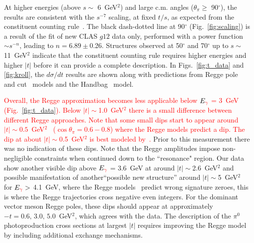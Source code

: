 \documentclass[aps,prc,twocolumn,floatfix,showpacs,preprintnumbers,amsmath,amssymb,superscriptaddress,linenumbers]{revtex4-1}
\begin{document}

At higher energies (above $s\sim$ 6~GeV$^2$) and large c.m. angles 
($\theta_{\pi}\geq$ 90$^\circ$), the results are consistent with 
the $s^{-7}$ scaling, at fixed $t/s$, as expected from the 
constituent counting rule~\cite{Brodsky:1973kr}. 
The black dash-dotted line at 90$^\circ$ (Fig.~\ref{fig:scaling}) 
is a result of the fit of new CLAS $g12$ data only, performed with a 
power function $\sim s^{-n}$, leading to $n = 6.89\pm$0.26.  
Structures observed at 50$^\circ$ and 70$^\circ$ up to 
$s\sim$11~GeV$^2$ indicate that the constituent 
counting rule requires higher energies and higher $|t|$ before it 
can provide a complete description.
In Figs.~\ref{fig:t_data} and \ref{fig:kroll}, the 
$d\sigma/dt$ results are shown along with predictions from 
Regge pole and cut~\cite{Goldstein:1973xn,Laget:2005be,
Mathieu:2015eia,Donnachie:2015jaa} models and the 
Handbag~\cite{Huang:2000kd} model. 

\textcolor{red}{Overall, the Regge approximation 
becomes less applicable below $E_{\textcolor{red}{\gamma}}$ = 3~GeV (Fig.~\ref{fig:t_data}). 
Below $|t|\sim$1.0~GeV$^2$ there is a small difference between 
different Regge approaches.    
Note that some small dips start to appear around $|t| \sim 0.5$~GeV$^2$
~($\cos \theta_{\pi} = 0.6-0.8$) where the Regge models predict a dip.  
The dip at about $|t|\sim$0.5~GeV$^2$ is best modeled by~\cite{Mathieu:2015eia}. }
Prior to this measurement there was no indication of these dips.
Note that the Regge amplitudes impose non-negligible constraints when continued down to the 
``resonance" region.
Our data show another visible dip above $E_{\textcolor{red}{\gamma}}$ = 3.6~GeV at around $|t|\sim$2.6~GeV$^2$ and possible manifestation of another``possible new structure'' around $|t|\sim$5~GeV$^2$ for $E_{\textcolor{red}{\gamma}} >$ 4.1~GeV, where the Regge models~\cite{Goldstein:1973xn,
Laget:2005be,Donnachie:2015jaa} predict wrong signature zeroes, 
this is where the Regge trajectories cross negative even integers. 
For the dominant vector meson Regge poles, these dips should appear 
at approximately $-t=0.6, \, 3.0, \, 5.0$~GeV$^2$,  which agrees 
with the data.  The description of the $\pi^0$ photoproduction 
cross sections at largest $\vert t \vert$ requires improving the 
Regge model by including additional exchange mechanisms.
\end{document}
